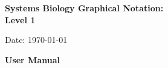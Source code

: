 \begin{titlepage}

\vspace*{0.75in}

\begin{center}

  \textbf{\sffamily\bfseries\huge
    Systems Biology Graphical Notation:\\[0.3em]
    \PDl Level 1}

\vspace*{0.5in}

Date: \today\\[0.25in]



\vspace{0.5in}

  \textbf{\sffamily\bfseries\huge
    User Manual}



\end{center}
\end{titlepage}
